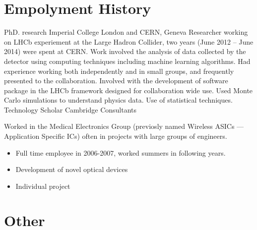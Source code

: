 \section{Empolyment History}
{PhD. research}
{Imperial College London and CERN, Geneva}
{}{}
{
  Researcher working on LHCb experiement at the Large Hadron Collider, two years (June 2012 -- June
  2014) were spent at CERN.
  Work involved the analysis of data collected by the detector using computing techniques including
  machine learning algorithms.
  Had experience working both independently and in small groups, and frequently presented to the
  collaboration.
  Involved with the development of software package in the LHCb framework designed for
  collaboration wide use.
  Used Monte Carlo simulations to understand physics data.
  Use of statistical techniques.
}
{Technology Scholar}
{Cambridge Consultants}
{}{}
{
  Worked in the Medical Electronics Group (previosly named Wireless ASICs --- Application Specific
  ICs) often in projects with large groups of engineers.
  \begin{itemize}
    \item Full time employee in 2006-2007, worked summers in following years.
    \item Development of novel optical devices
    \item Individual project
  \end{itemize}
}


\section{Other}

